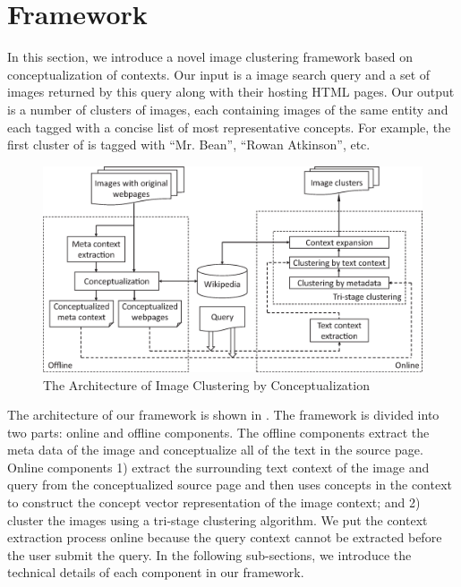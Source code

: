 \section{Framework}
\label{sec:algo}


In this section, we introduce a novel image clustering framework
based on conceptualization of contexts.
Our input is a image search query and
a set of images returned by this query along with their hosting HTML pages.
Our output is a number of clusters of images, each containing images
of the same entity and each tagged with a concise list of
most representative concepts. For example, the first
cluster of  is tagged with ``Mr. Bean'', 
``Rowan Atkinson'', etc.


\begin{figure}[th]
\begin{center}
\centering
\includegraphics[width=\columnwidth]{framework_novisual.eps}
\caption{The Architecture of Image Clustering by Conceptualization}
\label{fig:frame}
\end{center}
\vspace*{-5mm}
\end{figure}

The architecture of our framework is shown in .
The framework is divided into two parts: online and offline components.
The offline components extract the meta data of the image and
conceptualize all of the text in the source page. Online components 1) extract
the surrounding text context of the image and query from the conceptualized source page and
then uses concepts in the context to construct the concept vector
representation of the image context; and 2) cluster the images using
a tri-stage clustering algorithm. We put the context extraction process
online because the query context cannot be extracted before the user
submit the query. In the following sub-sections, we introduce the technical
details of each component in our framework.

